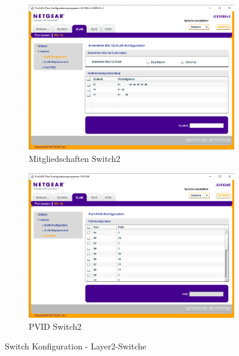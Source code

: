 \begin{figure}[H]
\begin{subfigure}{.49\linewidth}
                \centering
                \includegraphics[width=\linewidth]{images/Einrichtung Layer2-Switche/Config_Switch2.png}
                \caption{Mitgliedschaften Switch2}
            \end{subfigure}
            \begin{subfigure}{.49\linewidth}
                \centering
                \includegraphics[width=\linewidth]{images/Einrichtung Layer2-Switche/Config_PVID_Switch1.png}
                \caption{PVID Switch2}
            \end{subfigure}
        \caption{Switch Konfiguration - Layer2-Switche}
        \end{figure}
         
